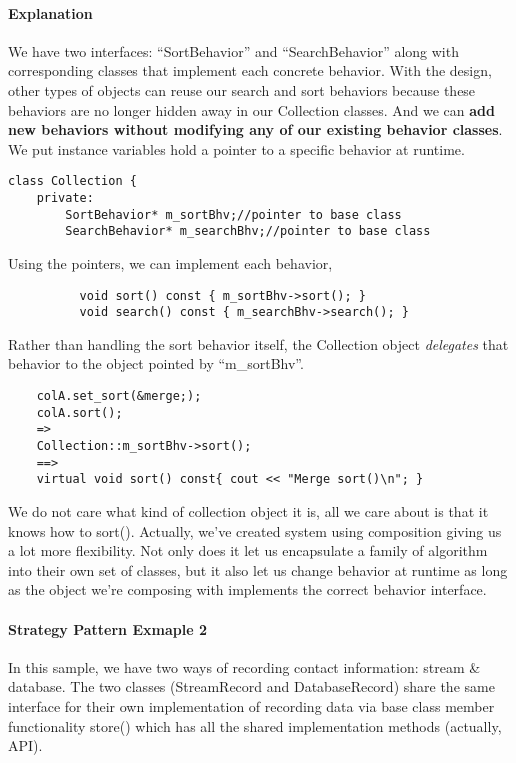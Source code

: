\documentclass{book}
\begin{document}
\paragraph{Explanation}
We have two interfaces: ``SortBehavior'' and ``SearchBehavior'' along with corresponding classes that implement each concrete behavior.
With the design, other types of objects can reuse our search and sort behaviors because these behaviors are no longer hidden away in our Collection classes.
And we can \textbf{add new behaviors without modifying any of our existing behavior classes}.
We put instance variables hold a pointer to a specific behavior at runtime.

\begin{verbatim}
class Collection {
    private:
        SortBehavior* m_sortBhv;//pointer to base class
        SearchBehavior* m_searchBhv;//pointer to base class
\end{verbatim}

    Using the pointers, we can implement each behavior,

\begin{verbatim}
          void sort() const { m_sortBhv->sort(); }
    	  void search() const { m_searchBhv->search(); }
\end{verbatim}
    Rather than handling the sort behavior itself, the Collection object \textit{delegates} that behavior to the object pointed by ``m\_sortBhv''.

\begin{verbatim}
    colA.set_sort(&merge;);
    colA.sort();
    =>
    Collection::m_sortBhv->sort();
    ==>
    virtual void sort() const{ cout << "Merge sort()\n"; }
\end{verbatim}
    We do not care what kind of collection object it is, all we care about is that it knows how to sort().
    Actually, we've created system using composition giving us a lot more flexibility.
    Not only does it let us encapsulate a family of algorithm into their own set of classes,
    but it also let us change behavior at runtime as long as the object we're composing with implements the correct behavior interface.

\paragraph{Strategy Pattern Exmaple 2}
In this sample, we have two ways of recording contact information: stream \& database.
The two classes (StreamRecord and DatabaseRecord) share the same interface for their own implementation of recording data via base class member functionality
store() which has all the shared implementation methods (actually, API).
\end{document}
